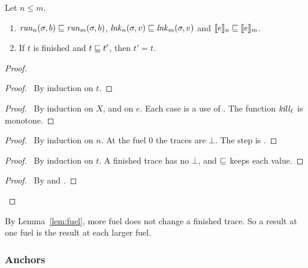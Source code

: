 \begin{lem}\label{lem:fuel}
  Let $n\le m$.
  \begin{enumerate}
    \item $\mathit{run}_{n}(\sigma,b)\sqsubseteq\mathit{run}_{m}(\sigma,b)$, $\mathit{lnk}_{n}(\sigma,v)\sqsubseteq\mathit{lnk}_{m}(\sigma,v)$ and $\llbracket{e}\rrbracket_{n}\sqsubseteq\llbracket{e}\rrbracket_{m}$.
    \item If $t$ is finished and $t\sqsubseteq t'$, then $t'=t$.
  \end{enumerate}
\end{lem}
\begin{proof}
  \begin{proof}
    \pf\ By induction on $t$.
  \end{proof}
  \begin{proof}
    \pf\ By induction on $X$, and on $e$.
    Each case is a use of .
    The function $\mathit{kill}_{\ell}$ is monotone.
  \end{proof}
  \begin{proof}
    \pf\ By induction on $n$.
    At the fuel $0$ the traces are $\bot$.
    The step is .
  \end{proof}
  \begin{proof}
    \pf\ By induction on $t$.
    A finished trace has no $\bot$, and $\sqsubseteq$ keeps each value.
  \end{proof}
  \qedstep
  \begin{proof}
    \pf\ By  and .
  \end{proof}
\end{proof}

By Lemma~\ref{lem:fuel}, more fuel does not change a finished trace.
So a result at one fuel is the result at each larger fuel.

\subsubsection{Anchors}\label{sec:anchors}

